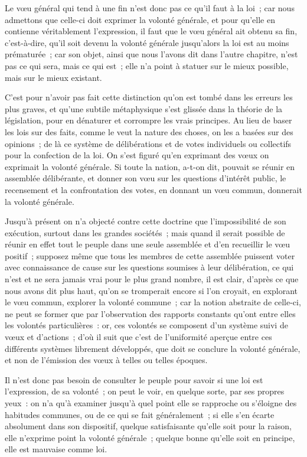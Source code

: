 \documentclass[french,twoside]{book} %
\begin{document}
Le vœu général qui tend à une fin n’est donc pas ce qu’il faut à la loi ; car nous admettons que celle-ci doit exprimer la volonté générale, et pour qu’elle en contienne véritablement l’expression, il faut que le vœu général ait obtenu sa fin, c’est-à-dire, qu’il soit devenu la volonté générale jusqu’alors la loi est au moins prématurée ; car son objet, ainsi que nous l’avons dit dans l’autre chapitre, n’est pas ce qui sera, mais ce qui est ; elle n’a point à statuer sur le mieux possible, mais sur le mieux existant.\par
C’est pour n’avoir pas fait cette distinction qu’on est tombé dans les erreurs les plus graves, et qu’une subtile métaphysique s’est glissée dans la théorie de la législation, pour en dénaturer et corrompre les vrais principes. Au lieu de baser les lois sur des faits, comme le veut la nature des choses, on les a basées sur des opinions ; de là ce système de délibérations et de votes individuels ou collectifs pour la confection de la loi. On s’est figuré qu’en exprimant des vœux on exprimait la volonté générale. Si toute la nation, a-t-on dit, pouvait se réunir en assemblée délibérante, et donner son vœu sur les questions d’intérêt public, le recensement et la confrontation des votes, en donnant un vœu commun, donnerait la volonté générale.\par
Jusqu’à présent on n’a objecté contre cette doctrine que l’impossibilité de son exécution, surtout dans les grandes sociétés ; mais quand il serait possible de réunir en effet tout le peuple dans une seule assemblée et d’en recueillir le vœu positif ; supposez même que tous les membres de cette assemblée puissent voter avec connaissance de cause sur les questions soumises à leur délibération, ce qui n’est et ne sera jamais vrai pour le plus grand nombre, il est clair, d’après ce que nous avons dit plus haut, qu’on se tromperait encore si l’on croyait, en explorant le vœu commun, explorer la volonté commune ; car la notion abstraite de celle-ci, ne peut se former que par l’observation des rapports constants qu’ont entre elles les volontés particulières : or, ces volontés se composent d’un système suivi de vœux et d’actions ; d’où il suit que c’est de l’uniformité aperçue entre ces différents systèmes librement développés, que doit se conclure la volonté générale, et non de l’émission des vœux à telles ou telles époques.\par
Il n’est donc pas besoin de consulter le peuple pour savoir si une loi est l’expression, de sa volonté ; on peut le voir, en quelque sorte, par ses propres yeux : on n’a qu’à examiner jusqu’à quel point elle se rapproche ou s’éloigne des habitudes communes, ou de ce qui se fait généralement ; si elle s’en écarte absolument dans son dispositif, quelque satisfaisante qu’elle soit pour la raison, elle n’exprime point la volonté générale ; quelque bonne qu’elle soit en principe, elle est mauvaise comme loi.\par
\end{document}
